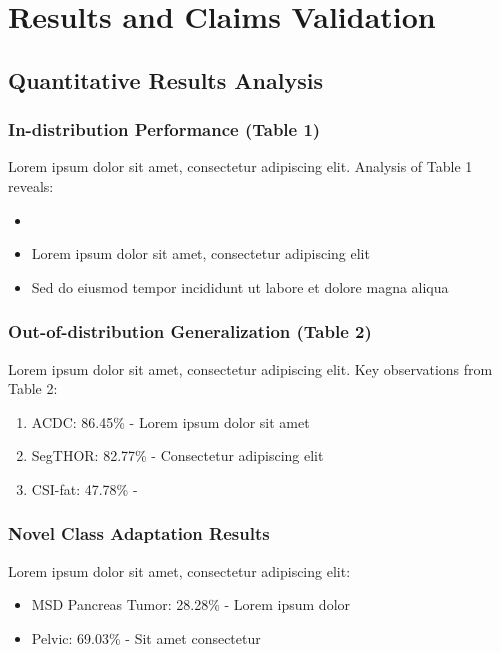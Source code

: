 \section*{Results and Claims Validation}
\label{sec:results_validation}

\subsection{Quantitative Results Analysis}
\subsubsection{In-distribution Performance (Table 1)}
Lorem ipsum dolor sit amet, consectetur adipiscing elit. Analysis of Table 1 reveals:
\begin{itemize}
    \item {}
    \item Lorem ipsum dolor sit amet, consectetur adipiscing elit
    \item Sed do eiusmod tempor incididunt ut labore et dolore magna aliqua
\end{itemize}

\subsubsection{Out-of-distribution Generalization (Table 2)}
Lorem ipsum dolor sit amet, consectetur adipiscing elit. Key observations from Table 2:
\begin{enumerate}
    \item ACDC: 86.45\% - Lorem ipsum dolor sit amet
    \item SegTHOR: 82.77\% - Consectetur adipiscing elit
    \item CSI-fat: 47.78\% - 
\end{enumerate}

\subsubsection{Novel Class Adaptation Results}
Lorem ipsum dolor sit amet, consectetur adipiscing elit:
\begin{itemize}
    \item MSD Pancreas Tumor: 28.28\% - Lorem ipsum dolor
    \item Pelvic: 69.03\% - Sit amet consectetur
\end{itemize}

